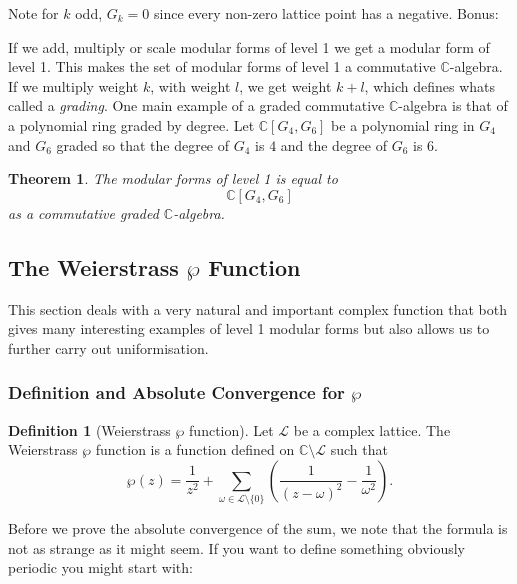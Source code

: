 \documentclass{article}
\newtheorem{thm}{Theorem}[section]
\theoremstyle{definition}
\newtheorem{definition}{Definition}[section]
\theoremstyle{definition}
\theoremstyle{definition}
\newcommand{\C}{\mathbb{C}}
\begin{document}
Note for $k$ odd, $G_k=0$ since every non-zero lattice point has a negative.
\newline\newline
Bonus:

If we add, multiply or scale modular forms of level 1 we get a modular form of level 1. This makes the set of modular forms of level 1 a commutative $\C$-algebra. If we multiply weight $k$, with weight $l$, we get weight $k+l$, which defines whats called a \emph{grading}.
\newline\newline
One main example of a graded commutative $\C$-algebra is that of a polynomial ring graded by degree.
\newline\newline
Let $\C[G_4,G_6]$ be a polynomial ring in $G_4$ and $G_6$ graded so that the degree of $G_4$ is $4$ and the degree of $G_6$ is $6$.

\begin{thm} The modular forms of level 1 is equal to
$$\C[G_4,G_6]$$
    as a commutative graded $\C$-algebra.
\end{thm}



\subsection{The Weierstrass $\wp$ Function}

This section deals with a very natural and important complex function that both gives many interesting examples of level 1 modular forms but also allows us to further carry out uniformisation.


\subsubsection{Definition and Absolute Convergence for $\wp$}

\begin{definition} [Weierstrass $\wp$ function]
   Let $\mathcal{L}$ be a complex lattice. The Weierstrass $\wp$ function is a function defined on $\mathbb{C}\setminus\mathcal{L}$ such that
   $$\wp(z)=\frac{1}{z^2}+\sum_{\omega\in\mathcal{L}\setminus\{0\}}\left(\frac{1}{(z-\omega)^2}-\frac{1}{\omega^2}\right).$$
\end{definition}

Before we prove the absolute convergence of the sum, we note that the formula is not as strange as it might seem. If you want to define something obviously periodic you might start with:
\end{document}

